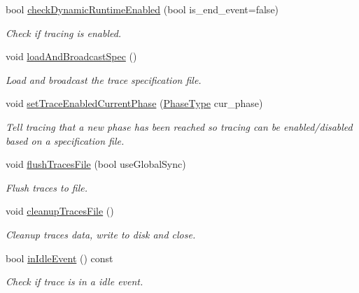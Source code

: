 \begin{DoxyCompactItemize}
bool \hyperlink{structvt_1_1trace_1_1_trace_a995bc2b464af735323a4c07f10b5c55b}{check\+Dynamic\+Runtime\+Enabled} (bool is\+\_\+end\+\_\+event=false)
\begin{DoxyCompactList}\small\item\em Check if tracing is enabled. \end{DoxyCompactList}\item 
void \hyperlink{structvt_1_1trace_1_1_trace_a06f74f8d2c0c2fb97be14a264fd36a45}{load\+And\+Broadcast\+Spec} ()
\begin{DoxyCompactList}\small\item\em Load and broadcast the trace specification file. \end{DoxyCompactList}\item 
void \hyperlink{structvt_1_1trace_1_1_trace_aa2740411eec8e1dabf10d60f48193e69}{set\+Trace\+Enabled\+Current\+Phase} (\hyperlink{namespacevt_a46ce6733d5cdbd735d561b7b4029f6d7}{Phase\+Type} cur\+\_\+phase)
\begin{DoxyCompactList}\small\item\em Tell tracing that a new phase has been reached so tracing can be enabled/disabled based on a specification file. \end{DoxyCompactList}\item 
void \hyperlink{structvt_1_1trace_1_1_trace_a2e07094a48c47b9c591003f0b57305c7}{flush\+Traces\+File} (bool use\+Global\+Sync)
\begin{DoxyCompactList}\small\item\em Flush traces to file. \end{DoxyCompactList}\item 
void \hyperlink{structvt_1_1trace_1_1_trace_ac764c356a7f81abadfe643d618f22b15}{cleanup\+Traces\+File} ()
\begin{DoxyCompactList}\small\item\em Cleanup traces data, write to disk and close. \end{DoxyCompactList}\item 
bool \hyperlink{structvt_1_1trace_1_1_trace_a1e7429d95dbddd9f235a02800d158d36}{in\+Idle\+Event} () const
\begin{DoxyCompactList}\small\item\em Check if trace is in a idle event. \end{DoxyCompactList}\end{DoxyCompactItemize}
